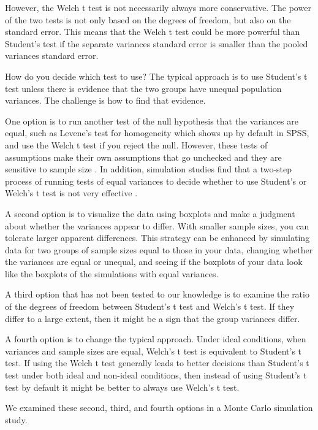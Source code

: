 \documentclass[man,a4paper,noextraspace,apacite]{apa6}\usepackage[]{graphicx}\usepackage[]{color}
\begin{document}
    However, the Welch t test is not necessarily always more conservative. The power of the two tests is not only based on the degrees of freedom, but also on the standard error. This means that the Welch t test could be more powerful than Student's test if the separate variances standard error is smaller than the pooled variances standard error. 
    
    How do you decide which test to use? The typical approach is to use Student's t test unless there is evidence that the two groups have unequal population variances. The challenge is how to find that evidence. 

    One option is to run another test of the null hypothesis that the variances are equal, such as Levene's test for homogeneity which shows up by default in SPSS, and use the Welch t test if you reject the null. However, these tests of assumptions make their own assumptions that go unchecked and they are sensitive to sample size \cite{Gonzalez2008}. In addition, simulation studies find that a two-step process of running tests of equal variances to decide whether to use Student's or Welch's t test is not very effective \cite{Zimmerman1996,Zimmerman2004}. 

    A second option is to visualize the data using boxplots and make a judgment about whether the variances appear to differ.  With smaller sample sizes, you can tolerate larger apparent differences. This strategy can be enhanced by simulating data for two groups of sample sizes equal to those in your data, changing whether the variances are equal or unequal, and seeing if the boxplots of your data look like the boxplots of the simulations with equal variances. 

    A third option that has not been tested to our knowledge is to examine the ratio of the degrees of freedom between Student's t test and Welch's t test. If they differ to a large extent, then it might be a sign that the group variances differ.

    A fourth option is to change the typical approach. Under ideal conditions, when variances and sample sizes are equal, Welch's t test is equivalent to Student's t test. If using the Welch t test generally leads to better decisions than Student's t test under both ideal and non-ideal conditions, then instead of using Student's t test by default it might be better to always use Welch's t test.
    
    We examined these second, third, and fourth options in a Monte Carlo simulation study. 
    
\end{document}

